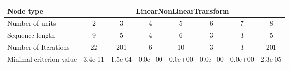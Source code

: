 \begin{tabular}{l|ccccccc|}
Node type & \multicolumn{7}{c}{LinearNonLinearTransform} \\
\hline
Number of units & 2 & 3 & 4 & 5 & 6 & 7 & 8 \\
Sequence length & 9 & 5 & 4 & 6 & 3 & 3 & 5 \\
Number of Iterations & 22 & 201 & 6 & 10 & 3 & 3 & 201 \\
Minimal criterion value & 3.4e-11 & 1.5e-04 & 0.0e+00 & 0.0e+00 & 0.0e+00 & 0.0e+00 & 2.3e-05 \\
\hline
\end{tabular}
